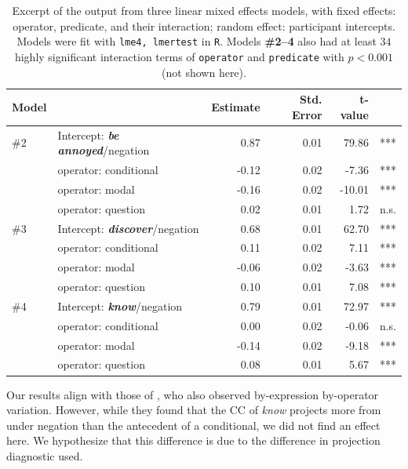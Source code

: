 \documentclass[a4paper,12pt,twoside]{article}
\begin{document}
			\begin{table}[ht]
				\centering
				\begin{tabular}{llrrrr}
					Model & & Estimate & Std. Error & t-value\\
					\midrule
					\#2 & Intercept: \emph{\bf be annoyed}/negation & 0.87 & 0.01 & 79.86 & ***\\
					& operator: conditional & -0.12 & 0.02  & -7.36 & ***\\
					& operator: modal & -0.16 & 0.02  & -10.01 & ***\\
					& operator: question & 0.02 & 0.01 & 1.72 & n.s.\\
					\midrule
					\#3 & Intercept: \emph{\bf discover}/negation & 0.68 & 0.01 & 62.70 & ***\\
					& operator: conditional & 0.11 & 0.02 & 7.11 & ***\\
					& operator: modal & -0.06 & 0.02 & -3.63 & ***\\
					& operator: question & 0.10 & 0.01 & 7.08 & ***\\
					\midrule
					\#4 & Intercept: \emph{\bf know}/negation & 0.79 & 0.01 & 72.97 & ***\\
					& operator: conditional & 0.00 & 0.02 & -0.06 & n.s.\\
					& operator: modal & -0.14 & 0.02 & -9.18 & ***\\
					& operator: question & 0.08 & 0.01 & 5.67 & ***\\
					\bottomrule
				\end{tabular}
				\caption{\small Excerpt of the output from three linear mixed effects models, with fixed effects: operator, predicate, and their interaction; random effect: participant intercepts.
				Models were fit with \texttt{lme4, lmertest} in \texttt{R}. Models \textbf{\#2--4} also had at least $34$ highly significant interaction terms of \texttt{operator} and \texttt{predicate} with $p < 0.001$ (not shown here).\label{t:models}}
			\end{table}

Our results align with those of \citealt{smith_relationship_2014}, who also observed by-expression by-operator variation. However, while they found that the CC of \emph{know} projects more from under negation than the antecedent of a conditional, we did not find an effect here. We hypothesize that this difference is due to the difference in projection diagnostic used. 
\end{document}
